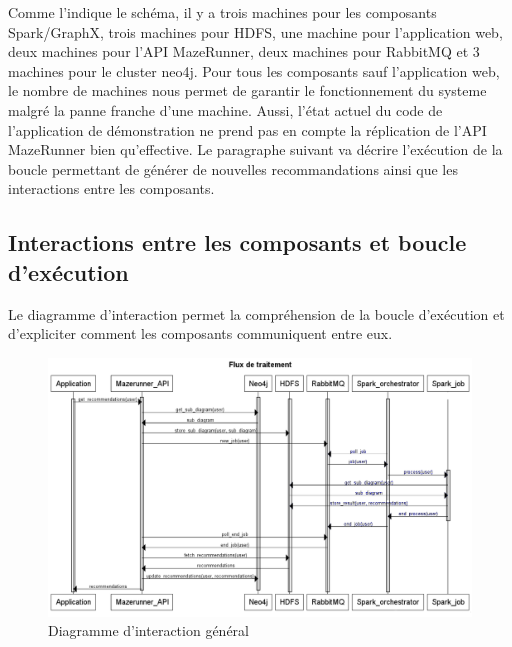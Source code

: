 Comme l'indique le schéma, il y a trois machines pour les composants Spark/GraphX, trois machines pour HDFS, une machine pour l'application web, deux machines pour l'API MazeRunner, deux machines pour RabbitMQ et 3 machines pour le cluster neo4j.
Pour tous les composants sauf l'application web, le nombre de machines nous permet de garantir le fonctionnement du systeme malgré la panne franche d'une machine. Aussi, l'état actuel du code de l'application de démonstration ne prend pas en compte la réplication de l'API MazeRunner bien qu'effective.
Le paragraphe suivant va décrire l'exécution de la boucle permettant de générer de nouvelles recommandations ainsi que les interactions entre les composants.

\subsection{Interactions entre les composants et boucle d'exécution}

Le diagramme d'interaction permet la compréhension de la boucle d'exécution et d'expliciter comment les composants communiquent entre eux.

\begin{figure}[h]
    \centering
    \includegraphics[scale=0.4]{pics/diagramme_interaction.png}
    \caption{Diagramme d'interaction général}
\end{figure}
\FloatBarrier

